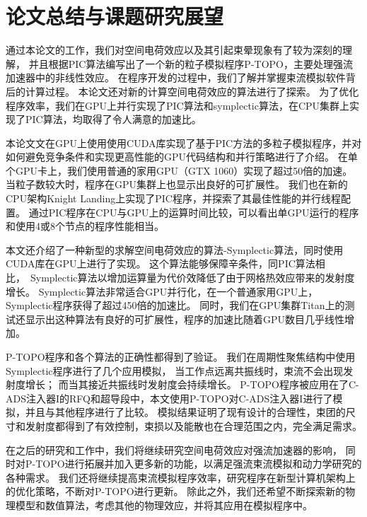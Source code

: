 
\chapter{论文总结与课题研究展望}
\label{chap:conclusion}
通过本论文的工作，我们对空间电荷效应以及其引起束晕现象有了较为深刻的理解，
并且根据PIC算法编写出了一个新的粒子模拟程序P-TOPO，主要处理强流加速器中的非线性效应。
在程序开发的过程中，我们了解并掌握束流模拟软件背后的计算过程。
本论文还对新的计算空间电荷效应的算法进行了探索。
为了优化程序效率，我们在GPU上并行实现了PIC算法和symplectic算法，在CPU集群上实现了PIC算法，均取得了令人满意的加速比。

本论文文在GPU上使用使用CUDA库实现了基于PIC方法的多粒子模拟程序，并对如何避免竞争条件和实现更高性能的GPU代码结构和并行策略进行了介绍。
在单个GPU卡上，我们使用普通的家用GPU（GTX 1060）实现了超过50倍的加速。
当粒子数较大时，程序在GPU集群上也显示出良好的可扩展性。
我们也在新的CPU架构Knight Landing上实现了PIC程序，并探索了其最佳性能的并行线程配置。
通过PIC程序在CPU与GPU上的运算时间比较，可以看出单GPU运行的程序和使用4或8个节点的程序性能相当。


本文还介绍了一种新型的求解空间电荷效应的算法-Symplectic算法，同时使用CUDA库在GPU上进行了实现。
这个算法能够保障辛条件，同PIC算法相比，~Symplectic算法以增加运算量为代价效降低了由于网格热效应带来的发射度增长。
Symplectic算法非常适合GPU并行化，在一个普通家用GPU上，Symplectic程序获得了超过450倍的加速比。
同时，我们在GPU集群Titan上的测试还显示出这种算法有良好的可扩展性，程序的加速比随着GPU数目几乎线性增加。

P-TOPO程序和各个算法的正确性都得到了验证。
我们在周期性聚焦结构中使用Symplectic程序进行了几个应用模拟，
当工作点远离共振线时，束流不会出现发射度增长；
而当其接近共振线时发射度会持续增长。
P-TOPO程序被应用在了C-ADS注入器I的RFQ和超导段中，本文使用P-TOPO对C-ADS注入器I进行了模拟，并且与其他程序进行了比较。
模拟结果证明了现有设计的合理性，束团的尺寸和发射度都得到了有效控制，束损以及能散也在合理范围之内，完全满足需求。

在之后的研究和工作中，我们将继续研究空间电荷效应对强流加速器的影响，
同时对P-TOPO进行拓展并加入更多新的功能，以满足强流束流模拟和动力学研究的各种需求。
我们还将继续提高束流模拟程序效率，研究程序在新型计算机架构上的优化策略，不断对P-TOPO进行更新。
除此之外，我们还希望不断探索新的物理模型和数值算法，考虑其他的物理效应，并将其应用在模拟程序中。